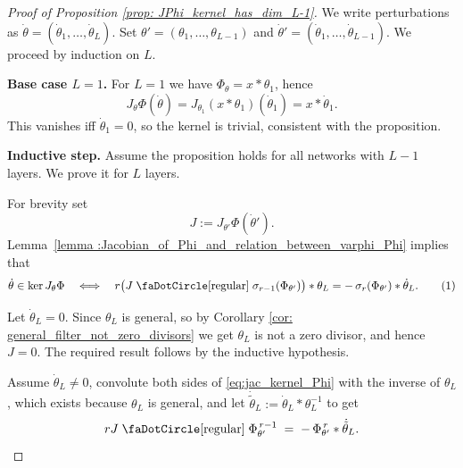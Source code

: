 \documentclass[final]{article}
\newcommand\numberthis{\addtocounter{equation}{1}\tag{\theequation}}
\newcommand{\conv}{\ast}
\newcommand{\circbd}{\mathrel{\text{\faDotCircle[regular]}}}
\theoremstyle{definition}
\theoremstyle{plain}
\begin{document}
\begin{proof}[Proof of Proposition \ref{prop: JPhi_kernel_has_dim_L-1}]
We write perturbations as $\dot\theta = (\dot\theta_1,\dots,\dot\theta_L)$.
Set $\theta'=(\theta_1,\dots,\theta_{L-1})$ and $\dot\theta'=(\dot\theta_1,\dots,\dot\theta_{L-1})$.
We proceed by induction on $L$.


\medskip
\noindent\textbf{Base case $L=1$.}
For $L=1$ we have $\Phi_\theta = x\conv \theta_1$, hence
\[
J_\theta \Phi(\dot\theta)
= J_{\theta_1}(x\conv\theta_1)(\dot\theta_1)
= x\conv \dot\theta_1.
\]
This vanishes iff $\dot\theta_1=0$, so the kernel is trivial, consistent with the proposition.


\medskip
\noindent\textbf{Inductive step.}
Assume the proposition holds for all networks with $L-1$ layers.
We prove it for $L$ layers.

For brevity set
\[
J := J_{\theta'}\Phi(\dot\theta').
\]
Lemma~\ref{lemma :Jacobian_of_Phi_and_relation_between_varphi_Phi}
implies that
\[
\dot\theta\in\ker J_\theta\Phi
\quad\Longleftrightarrow\quad
r\bigl(J \circbd \sigma_{r-1}(\Phi_{\theta'})\bigr)\conv\theta_L
= -\,\sigma_r(\Phi_{\theta'})\conv\dot\theta_L.
\numberthis\label{eq:jac_kernel_Phi}
\]

Let $\dot \theta_L = 0$. 
Since $\theta_L$ is general, so by Corollary \ref{cor: general_filter_not_zero_divisors} we get $\theta_L$ is not a zero divisor, and hence $J = 0$. The required result follows by the inductive hypothesis.

Assume $\dot \theta_L \neq 0$, convolute both sides of \eqref{eq:jac_kernel_Phi} with the inverse of $\theta_L$, which exists because $\theta_L$ is general, and let $\dot{\tilde{\theta}}_L := \dot \theta_L \conv \theta_L^{-1}$ to get 
\begin{equation}\label{eq:jac_kernel_Phi_mult_by_theta_L_inverse}
rJ\circbd \Phi_{\theta'}^{\,r-1}
\;=\;
-\,\Phi_{\theta'}^{\,r}\conv \dot{\tilde{\theta}}_L.
\end{equation}


\end{proof}
\end{document}
